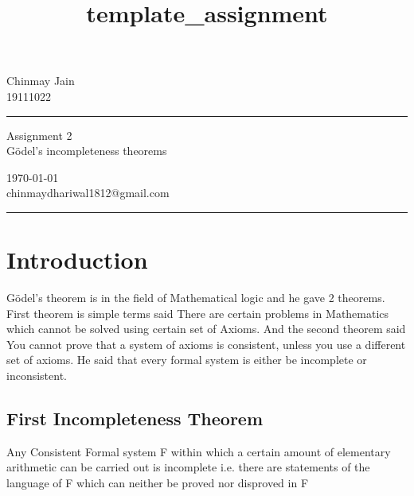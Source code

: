\documentclass[a4paper,10pt]{article} %
\begin{document}

\title{template_assignment} %
\fancyhead[C]{}
\begin{minipage}{0.295\textwidth} %
\raggedright
Chinmay Jain\\ %
\footnotesize %
19111022 %
\medskip\hrule
\end{minipage}
\begin{minipage}{0.4\textwidth} %
\centering 
\large %
Assignment 2\\ %
\normalsize %
Gödel's incompleteness theorems\\ %
\end{minipage}
\begin{minipage}{0.295\textwidth} %
\raggedleft
\today\\ %
\footnotesize %
chinmaydhariwal1812@gmail.com%
\medskip\hrule
\end{minipage}



\bigskip
\section{Introduction}
Gödel's theorem is in the field of Mathematical logic and he gave 2 theorems. First theorem is simple terms said There are certain problems in Mathematics which cannot be solved using certain set of Axioms. And the second theorem said You cannot prove that a system of axioms is consistent, unless you use a different set of axioms.
He said that every formal system is either be incomplete or inconsistent.\\

\subsection{First Incompleteness Theorem  } 
Any Consistent Formal system F within which a certain amount of elementary arithmetic can be carried out is incomplete i.e. there are statements of the language of F which can neither be proved nor disproved in F
\end{document}
